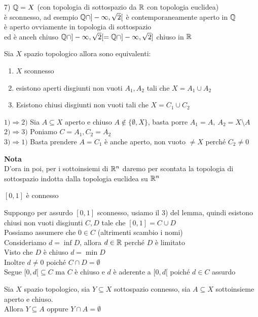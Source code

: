 \documentclass[12px]{article}
\begin{document}
 7) $\mathbb{Q} = X$ (con topologia di sottospazio da  $\mathbb{R} $ con topologia euclidea)\\
 è sconnesso, ad esempio $\mathbb{Q}\cap ]-\infty, \sqrt 2 [$ è contemporaneamente aperto in $\mathbb{Q}$\\
 è aperto ovviamente in topologia di sottospazio\\
 ed è anceh chiuso  $\mathbb{Q}\cap ]-\infty, \sqrt 2 [ = \mathbb{Q}\cap ]-\infty, \sqrt 2 ]$ chiuso in $\mathbb{R}$
 \begin{lemm}
 	Sia $X$ spazio topologico allora sono equivalenti:
	\begin{enumerate}
		\item $X$ sconnesso
		\item esistono aperti disgiunti non vuoti $A_1, A_2$ tali che $X = A_1\cup A_2$ 
		\item Esistono chiusi disgiunti non vuoti tali che $X = C_1\cup C_2$
	\end{enumerate}
 \end{lemm}
 \begin{dimo}
	 $1) \Rightarrow 2)$ Sia $A\subseteq X$ aperto e chiuso $A\not\in\{\emptyset, X\}$, basta porre  $A_1 = A, \ A_2 = X\setminus A$\\
	 $2) \Rightarrow 3)$ Poniamo $C = A_1, C_2 = A_2$\\
	 $3) \Rightarrow  1)$ Basta prendere $A = C_1$ è anche aperto, non vuoto $\neq X$ perché $C_2 \neq 0 $
 \end{dimo}
 \textbf{Nota}\\
 D'ora in poi, per i sottoinsiemi di $\mathbb{R}^n$ daremo per scontata la topologia di sottospazio indotta dalla topologia euclidea su $\mathbb{R}^n$
 \begin{teo}
	 $[0,1]$ è connesso
 \end{teo}
 \begin{dimo}
	 Suppongo per assurdo $[0,1]$ sconnesso, usiamo il 3) del lemma, quindi esistono chiusi non vuoti disgiunti $C,D$ tale che  $[0,1] = C\cup D$\\
	 Possiamo assumere che  $0\in C$ (altrimenti scambio i nomi)\\
	 Consideriamo $ d = \inf D$, allora $d\in\mathbb{R}$  perché $D$ è limitato\\
	 Visto che $D$ è chiuso $d = \min D$\\
	 Inoltre  $d\neq 0 $ poiché  $C\cap D = \emptyset$\\
	 Segue  $[0,d[\subseteq C$ ma  $C$ è chiuso e $d$ è aderente a $[0,d[$ poiché  $d\in C$ assurdo
 \end{dimo}
 \begin{lemm}
	 Sia $X$ spazio topologico, sia $Y\subseteq X$ sottospazio connesso, sia $A\subseteq X$ sottoinsieme aperto e chiuso.\\
	 Allora  $Y\subseteq A$ oppure $Y\cap A = \emptyset$
 \end{lemm}
\end{document}
